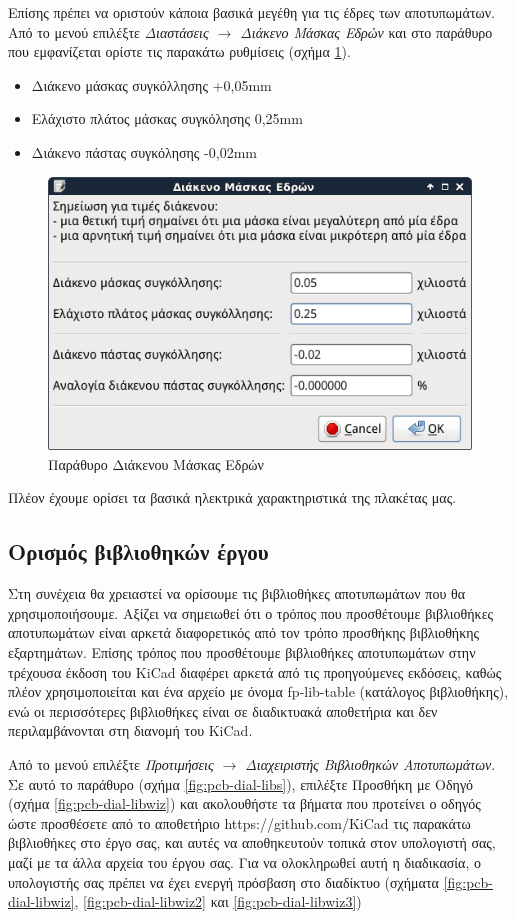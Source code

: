 \documentclass[a4paper]{article}
\begin{document}
Επίσης πρέπει να οριστούν κάποια βασικά μεγέθη για τις έδρες των αποτυπωμάτων. Από το μενού επιλέξτε \textit{Διαστάσεις $\rightarrow$ Διάκενο Μάσκας Εδρών} και στο παράθυρο που εμφανίζεται ορίστε τις παρακάτω ρυθμίσεις (σχήμα \ref{fig:pcb-dial-padclear}).

\begin{itemize}
    \item Διάκενο μάσκας συγκόλλησης +0,05mm
    \item Ελάχιστο πλάτος μάσκας συγκόλησης 0,25mm
    \item Διάκενο πάστας συγκόλησης -0,02mm
\end{itemize}

\begin{figure}
  \begin{center}
    \includegraphics[width=.5\textwidth]{img/pcb-dial-padclear.png}
    \caption{Παράθυρο Διάκενου Μάσκας Εδρών}
    \label{fig:pcb-dial-padclear}
  \end{center}
\end{figure}

Πλέον έχουμε ορίσει τα βασικά ηλεκτρικά χαρακτηριστικά της πλακέτας μας.

\subsection{Ορισμός βιβλιοθηκών έργου}
Στη συνέχεια θα χρειαστεί να ορίσουμε τις βιβλιοθήκες αποτυπωμάτων που θα χρησιμοποιήσουμε. Αξίζει να σημειωθεί ότι ο τρόπος που προσθέτουμε βιβλιοθήκες αποτυπωμάτων είναι αρκετά διαφορετικός από τον τρόπο προσθήκης βιβλιοθήκης εξαρτημάτων. Επίσης τρόπος που προσθέτουμε βιβλιοθήκες αποτυπωμάτων στην τρέχουσα έκδοση του KiCad διαφέρει αρκετά από τις προηγούμενες εκδόσεις, καθώς πλέον χρησιμοποιείται και ένα αρχείο με όνομα fp-lib-table (κατάλογος βιβλιοθήκης), ενώ οι περισσότερες βιβλιοθήκες είναι σε διαδικτυακά αποθετήρια και δεν περιλαμβάνονται στη διανομή του KiCad.

Από το μενού επιλέξτε \textit{Προτιμήσεις $\rightarrow$ Διαχειριστής Βιβλιοθηκών Αποτυπωμάτων}. Σε αυτό το παράθυρο (σχήμα \ref{fig:pcb-dial-libs}), επιλέξτε Προσθήκη με Οδηγό (σχήμα \ref{fig:pcb-dial-libwiz}) και ακολουθήστε τα βήματα που προτείνει ο οδηγός ώστε προσθέσετε από το αποθετήριο https://github.com/KiCad τις παρακάτω βιβλιοθήκες στο έργο σας, και αυτές να αποθηκευτούν τοπικά στον υπολογιστή σας, μαζί με τα άλλα αρχεία του έργου σας. Για να ολοκληρωθεί αυτή η διαδικασία, ο υπολογιστής σας πρέπει να έχει ενεργή πρόσβαση στο διαδίκτυο (σχήματα \ref{fig:pcb-dial-libwiz}, \ref{fig:pcb-dial-libwiz2} και \ref{fig:pcb-dial-libwiz3})
\end{document}
